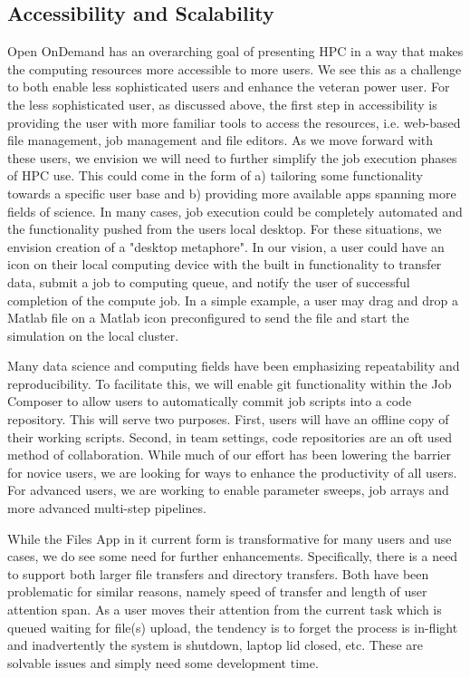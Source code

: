 \documentclass[runningheads]{llncs}
\begin{document}
\subsection{Accessibility and Scalability}

Open OnDemand has an overarching goal of presenting HPC in a way that makes the computing resources more accessible to more users.  We see this as a challenge to both enable less sophisticated users and enhance the veteran power user.  For the less sophisticated user, as discussed above, the first step in accessibility is providing the user with more familiar tools to access the resources, i.e. web-based file management, job management and file editors.  As we move forward with these users, we envision we will need to further simplify the job execution phases of HPC use.  This could come in the form of a) tailoring some functionality towards a specific user base and b) providing more available apps spanning more fields of science.  In many cases, job execution could be completely automated and the functionality pushed from the users local desktop.  For these situations, we envision creation of a "desktop metaphore".  In our vision, a user could have an icon on their local computing device with the built in functionality to transfer data, submit a job to computing queue, and notify the user of successful completion of the compute job.  In a simple example, a user may drag and drop a Matlab file on a Matlab icon preconfigured to send the file and start the simulation on the local cluster.

Many data science and computing fields have been emphasizing repeatability and reproducibility.  To facilitate this, we will enable git functionality within the Job Composer to allow users to automatically commit job scripts into a code repository.  This will serve two purposes.  First, users will have an offline copy of their working scripts.  Second, in team settings, code repositories are an oft used method of collaboration.  While much of our effort has been lowering the barrier for novice users, we are looking for ways to enhance the productivity of all users.  For advanced users, we are working to enable parameter sweeps, job arrays and more advanced multi-step pipelines.  

While the Files App in it current form is transformative for many users and use cases, we do see some need for further enhancements.  Specifically, there is a need to support both larger file transfers and directory transfers.  Both have been problematic for similar reasons, namely speed of transfer and length of user attention span.  As a user moves their attention from the current task which is queued waiting for file(s) upload, the tendency is to forget the process is in-flight and inadvertently the system is shutdown, laptop lid closed, etc.  These are solvable issues and simply need some development time.
\end{document}
